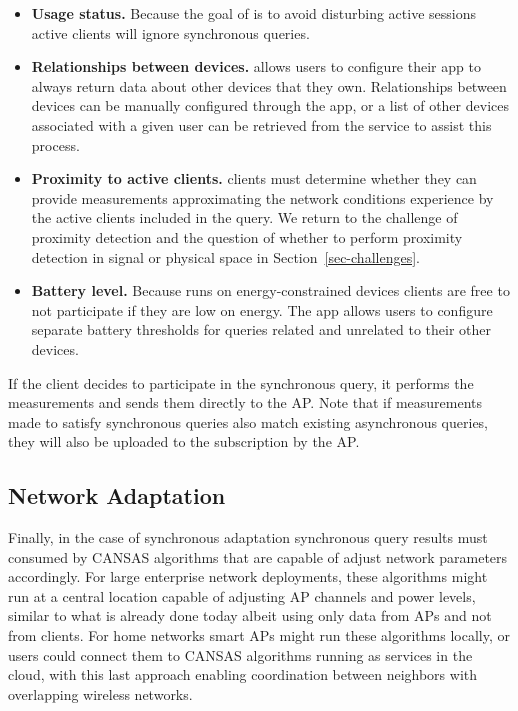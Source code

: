 \begin{itemize}

\item \textbf{Usage status.} Because the goal of \PS{} is to avoid disturbing
active sessions active clients will ignore synchronous queries.

\item \textbf{Relationships between devices.} \PS{} allows users to
configure their app to always return data about other devices that they own.
Relationships between devices can be manually configured through the app,
or a list of other devices associated with a given user can be retrieved from
the \PS{} service to assist this process.

\item \textbf{Proximity to active clients.} \PS{} clients must determine
whether they can provide measurements approximating the network conditions
experience by the active clients included in the query. We return to the
challenge of proximity detection and the question of whether to perform
proximity detection in signal or physical space in
Section~\ref{sec-challenges}.

\item \textbf{Battery level.} Because \PS{} runs on energy-constrained
  devices clients are free to not participate if they are low on energy. The
  \PS{} app allows users to configure separate battery thresholds for queries
  related and unrelated to their other devices.

\end{itemize}

If the client decides to participate in the synchronous query, it performs
the measurements and sends them directly to the AP. Note that if measurements
made to satisfy synchronous queries also match existing asynchronous queries,
they will also be uploaded to the \PS{} subscription by the AP.

\subsection{Network Adaptation}

Finally, in the case of synchronous adaptation synchronous query results must
consumed by CANSAS algorithms that are capable of adjust network parameters
accordingly. For large enterprise network deployments, these algorithms might
run at a central location capable of adjusting AP channels and power levels,
similar to what is already done today albeit using only data from APs and not
from clients. For home networks smart \PS{} APs might run these algorithms
locally, or users could connect them to CANSAS algorithms running as services
in the cloud, with this last approach enabling coordination between neighbors
with overlapping wireless networks.
